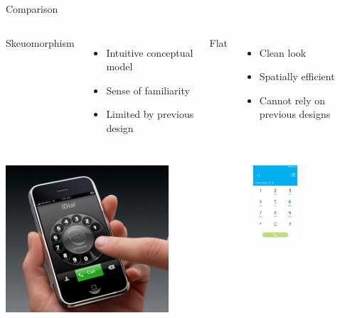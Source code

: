 \documentclass{beamer}
\begin{document}
\begin{frame}{Comparison}
    \begin{columns}[c]
            Skeuomorphism
            \begin{itemize}
                \item Intuitive conceptual model
                \item Sense of familiarity
                \item Limited by previous design
            \end{itemize}
            Flat
            \begin{itemize}
                \item Clean look
                \item Spatially efficient
                \item Cannot rely on previous designs
            \end{itemize}
    \end{columns}
    \begin{columns}[c]
                    \begin{center}
                    \includegraphics[width=0.7\textwidth]{idial.jpg}
                    \end{center}
                    \begin{center}
                    \includegraphics[width=0.4\textwidth]{dial-flat.png}

\end{center}
\end{columns}
\end{frame}
\end{document}
